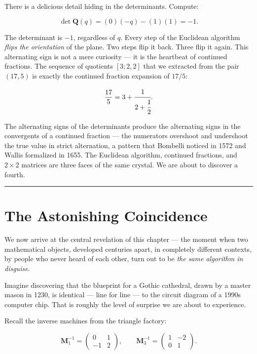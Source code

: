 \documentclass[11pt,openany]{book}
\theoremstyle{definition}
\theoremstyle{plain}
\theoremstyle{remark}
\begin{document}
There is a delicious detail hiding in the determinants. Compute:

\[
\det \mathbf{Q}(q) = (0)(- q) - (1)(1) = -1.
\]


The determinant is $-1$, regardless of $q$. Every step of the Euclidean algorithm \textit{flips the orientation} of the plane. Two steps flip it back. Three flip it again. This alternating sign is not a mere curiosity — it is the heartbeat of continued fractions. The sequence of quotients $[3; 2, 2]$ that we extracted from the pair $(17, 5)$ is exactly the continued fraction expansion of $17/5$:

\[
\frac{17}{5} = 3 + \cfrac{1}{2 + \cfrac{1}{2}}.
\]


The alternating signs of the determinants produce the alternating signs in the convergents of a continued fraction — the numerators overshoot and undershoot the true value in strict alternation, a pattern that Bombelli noticed in 1572 and Wallis formalized in 1655. The Euclidean algorithm, continued fractions, and $2 \times 2$ matrices are three faces of the same crystal. We are about to discover a fourth.

\bigskip\noindent\rule{\textwidth}{0.4pt}\bigskip


\section*{The Astonishing Coincidence}


We now arrive at the central revelation of this chapter — the moment when two mathematical objects, developed centuries apart, in completely different contexts, by people who never heard of each other, turn out to be \textit{the same algorithm in disguise}.

Imagine discovering that the blueprint for a Gothic cathedral, drawn by a master mason in 1230, is identical — line for line — to the circuit diagram of a 1990s computer chip. That is roughly the level of surprise we are about to experience.

Recall the inverse machines from the triangle factory:

\[
\mathbf{M}_1^{-1} = \begin{pmatrix} 0 & 1 \\ -1 & 2 \end{pmatrix}, \qquad
\mathbf{M}_3^{-1} = \begin{pmatrix} 1 & -2 \\ 0 & 1 \end{pmatrix}.
\]
\end{document}
